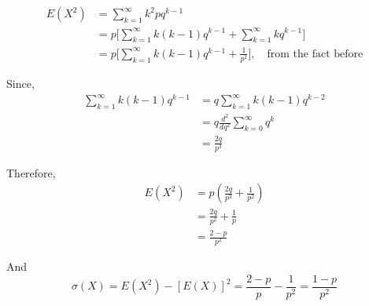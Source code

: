 \documentclass[UTF8]{article}
\begin{document}
\begin{enumerate}
        \begin{equation*}
            \begin{split}
                E(X^2) &= \sum^\infty_{k=1}k^2pq^{k-1}\\
                &=p\bigg[\sum^\infty_{k=1}k(k-1)q^{k-1}+\sum^\infty_{k=1}kq^{k-1}\bigg]\\
                &=p\bigg[\sum^\infty_{k=1}k(k-1)q^{k-1}+\frac{1}{p^2}\bigg],\quad\text{from the fact before}
            \end{split}
        \end{equation*}

        Since,
        \begin{equation*}
            \begin{split}
                \sum^\infty_{k=1}k(k-1)q^{k-1} & =q\sum^\infty_{k=1}k(k-1)q^{k-2}\\
                &= q\frac{d^2}{dq^2}\sum^\infty_{k=0}q^k\\
                &=\frac{2q}{p^3}
            \end{split}
        \end{equation*}
        
        Therefore,
        \begin{equation*}
            \begin{split}
                E(X^2) &= p(\frac{2q}{p^3}+\frac{1}{p^2})\\
                &=\frac{2q}{p^2}+\frac{1}{p}\\
                &=\frac{2-p}{p^2}
            \end{split}
        \end{equation*}
        
        And
        \begin{equation*}
            \sigma(X)=E(X^2)-[E(X)]^2=\frac{2-p}{p}-\frac{1}{p^2}=\frac{1-p}{p^2}
        \end{equation*}


\end{enumerate}
\end{document}

